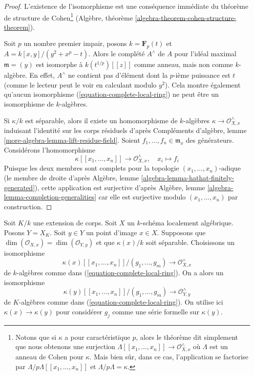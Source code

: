 \begin{proof}
L'existence de l'isomorphisme est une conséquence immédiate du
théorème de structure de Cohen\footnote{Notons que si $\kappa$ a
pour caractéristique $p$, alors le théorème dit simplement que nous
obtenons une surjection $\Lambda[[x_1, \ldots, x_n]] \to
\mathcal{O}_{X, x}^\wedge$ où $\Lambda$ est un anneau de Cohen pour
$\kappa$. Mais bien sûr, dans ce cas, l'application se factorise par
$\Lambda/p\Lambda[[x_1, \ldots, x_n]]$ et $\Lambda/p\Lambda = \kappa$.
} (Algèbre, théorème \ref{algebra-theorem-cohen-structure-theorem}).

\medskip\noindent
Soit $p$ un nombre premier impair, posons $k =
\mathbf{F}_p(t)$ et $A = k[x, y]/(y^2 + x^p - t)$. Alors le
complété $A^\wedge$ de $A$ pour l'idéal maximal $\mathfrak m
= (y)$ est isomorphe à $k(t^{1/p})[[z]]$ comme anneau,
mais non comme $k$-algèbre. En effet, $A^\wedge$
ne contient pas d'élément dont la $p$-ième puissance est $t$
(comme le lecteur peut le voir en calculant modulo $y^2$). Cela
montre également qu'aucun isomorphisme
(\ref{equation-complete-local-ring}) ne peut être un isomorphisme de $k$-algèbres.

\medskip\noindent
Si $\kappa/k$ est séparable, alors il existe un
homomorphisme de $k$-algèbres $\kappa \to \mathcal{O}_{X,
x}^\wedge$ induisant l'identité sur les corps résiduels
d'après Compléments d'algèbre, lemme
\ref{more-algebra-lemma-lift-residue-field}. Soient $f_1,
\ldots, f_n \in \mathfrak m_x$ des générateurs. Considérons l'homomorphisme
$$
\kappa[[x_1, \ldots, x_n]] \longrightarrow \mathcal{O}_{X, x}^\wedge,\quad
x_i \longmapsto f_i
$$
Puisque les deux membres sont complets pour la topologie
$(x_1, \ldots, x_n)$-adique (le membre de droite d'après
Algèbre, lemme
\ref{algebra-lemma-hathat-finitely-generated}), cette
application est surjective d'après Algèbre, lemme
\ref{algebra-lemma-completion-generalities} car elle est
surjective modulo $(x_1, \ldots, x_n)$ par construction.
\end{proof}

\begin{lemma}
\label{lemma-base-change-complete-local-ring}
Soit $K/k$ une extension de corps. Soit
$X$ un $k$-schéma localement algébrique. Posons $Y = X_K$.
Soit $y \in Y$ un point d'image $x \in X$.
Supposons que $\dim(\mathcal{O}_{X, x}) = \dim(\mathcal{O}_{Y,
y})$ et que $\kappa(x)/k$ soit séparable. Choisissons un isomorphisme
$$
\kappa(x)[[x_1, \ldots, x_n]]/(g_1, \ldots, g_m) \longrightarrow
\mathcal{O}_{X, x}^\wedge
$$
de $k$-algèbres comme dans
(\ref{equation-complete-local-ring}). On a alors un isomorphisme
$$
\kappa(y)[[x_1, \ldots, x_n]]/(g_1, \ldots, g_m) \longrightarrow
\mathcal{O}_{Y, y}^\wedge
$$
de $K$-algèbres comme dans
(\ref{equation-complete-local-ring}). On utilise ici $\kappa(x)
\to \kappa(y)$ pour considérer $g_j$ comme une série formelle sur $\kappa(y)$.
\end{lemma}


